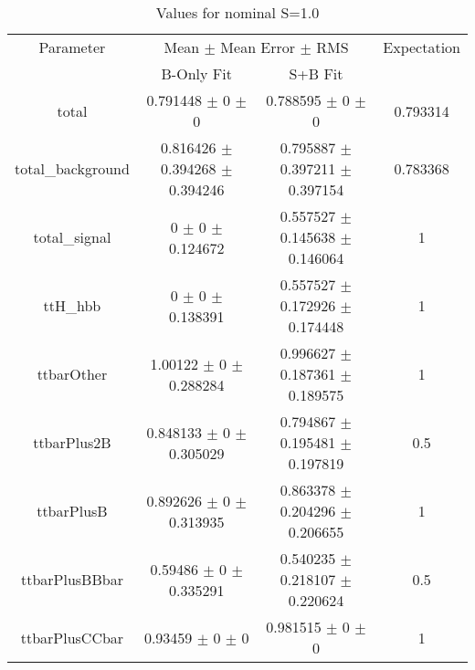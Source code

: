 \begin{table}
\centering
\caption{Values for nominal S=1.0}
\begin{tabular}{cccc}
\toprule
Parameter & \multicolumn{2}{c}{Mean $\pm$ Mean Error $\pm$ RMS} & Expectation\\
 & B-Only Fit & S+B Fit & \\
\midrule
total & \num{0.791448} $\pm$ \num{0} $\pm$ \num{0} & \num{0.788595} $\pm$ \num{0} $\pm$ \num{0} & \num{0.793314}\\
total\_background & \num{0.816426} $\pm$ \num{0.394268} $\pm$ \num{0.394246} & \num{0.795887} $\pm$ \num{0.397211} $\pm$ \num{0.397154} & \num{0.783368}\\
total\_signal & \num{0} $\pm$ \num{0} $\pm$ \num{0.124672} & \num{0.557527} $\pm$ \num{0.145638} $\pm$ \num{0.146064} & \num{1}\\
ttH\_hbb & \num{0} $\pm$ \num{0} $\pm$ \num{0.138391} & \num{0.557527} $\pm$ \num{0.172926} $\pm$ \num{0.174448} & \num{1}\\
ttbarOther & \num{1.00122} $\pm$ \num{0} $\pm$ \num{0.288284} & \num{0.996627} $\pm$ \num{0.187361} $\pm$ \num{0.189575} & \num{1}\\
ttbarPlus2B & \num{0.848133} $\pm$ \num{0} $\pm$ \num{0.305029} & \num{0.794867} $\pm$ \num{0.195481} $\pm$ \num{0.197819} & \num{0.5}\\
ttbarPlusB & \num{0.892626} $\pm$ \num{0} $\pm$ \num{0.313935} & \num{0.863378} $\pm$ \num{0.204296} $\pm$ \num{0.206655} & \num{1}\\
ttbarPlusBBbar & \num{0.59486} $\pm$ \num{0} $\pm$ \num{0.335291} & \num{0.540235} $\pm$ \num{0.218107} $\pm$ \num{0.220624} & \num{0.5}\\
ttbarPlusCCbar & \num{0.93459} $\pm$ \num{0} $\pm$ \num{0} & \num{0.981515} $\pm$ \num{0} $\pm$ \num{0} & \num{1}\\
\bottomrule
\end{tabular}
\end{table}